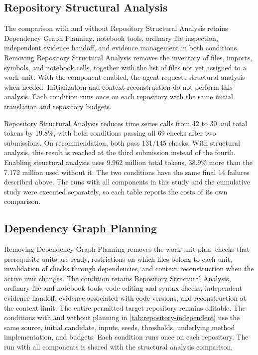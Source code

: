 \subsection{Repository Structural Analysis}
The comparison with and without Repository Structural Analysis retains Dependency Graph Planning, notebook tools, ordinary file inspection, independent evidence handoff, and evidence management in both conditions. Removing Repository Structural Analysis removes the inventory of files, imports, symbols, and notebook cells, together with the list of files not yet assigned to a work unit. With the component enabled, the agent requests structural analysis when needed. Initialization and context reconstruction do not perform this analysis. Each condition runs once on each repository with the same initial translation and repository budgets.
\begin{table}[!htb]
\caption{Repository comparisons that remove one component at a time. Both comparisons use the same LaDiM run with all components for each repository. Checks reports passed behavior checks. Calls cover investigation and repair, and tokens include initial translation. Tokens are in millions.}
\label{tab:repository-independent}
\centering
\small
\setlength{\tabcolsep}{3pt}

\end{table}
Repository Structural Analysis reduces time series calls from 42 to 30 and total tokens by 19.8\%, with both conditions passing all 69 checks after two submissions. On recommendation, both pass 131/145 checks. With structural analysis, this result is reached at the third submission instead of the fourth. Enabling structural analysis uses 9.962 million total tokens, 38.9\% more than the 7.172 million used without it. The two conditions have the same final 14 failures described above. The runs with all components in this study and the cumulative study were executed separately, so each table reports the costs of its own comparison.

\subsection{Dependency Graph Planning}
Removing Dependency Graph Planning removes the work-unit plan, checks that prerequisite units are ready, restrictions on which files belong to each unit, invalidation of checks through dependencies, and context reconstruction when the active unit changes. The condition retains Repository Structural Analysis, ordinary file and notebook tools, code editing and syntax checks, independent evidence handoff, evidence associated with code versions, and reconstruction at the context limit. The entire permitted target repository remains editable. The conditions with and without planning in \cref{tab:repository-independent} use the same source, initial candidate, inputs, seeds, thresholds, underlying method implementation, and budgets. Each condition runs once on each repository. The run with all components is shared with the structural analysis comparison.


